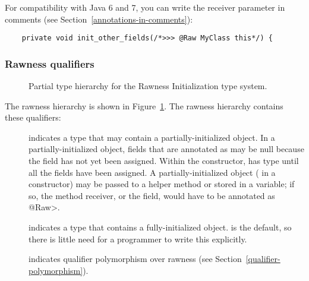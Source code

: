 For compatibility with Java 6 and 7, you can write the receiver
parameter in comments (see Section~\ref{annotations-in-comments}):
\begin{Verbatim}
    private void init_other_fields(/*>>> @Raw MyClass this*/) {
\end{Verbatim}


\subsubsection{Rawness qualifiers\label{rawness-qualifiers}}

\begin{figure}
\caption{Partial type hierarchy for the Rawness Initialization type system.}
\label{fig-rawness-hierarchy}
\end{figure}

The rawness hierarchy is shown in Figure~\ref{fig-rawness-hierarchy}.
The rawness hierarchy contains these qualifiers:

\begin{description}

\item[]
  indicates a type that may contain a partially-initialized object.  In a
  partially-initialized object, fields that are annotated as
   may be null because the field
  has not yet been assigned.  Within the constructor,
   has  type until all
  the  fields have been assigned.
  A partially-initialized object ( in a constructor) may be
  passed to a helper method or stored in a variable; if so, the method
  receiver, or the field, would have to be annotated as \<@Raw>.

\item[]
  indicates a type that contains a fully-initialized object.  
  is the default, so there is little need for a programmer to write this
  explicitly.

\item[]
  indicates qualifier polymorphism over rawness (see
  Section~\ref{qualifier-polymorphism}).

\end{description}

